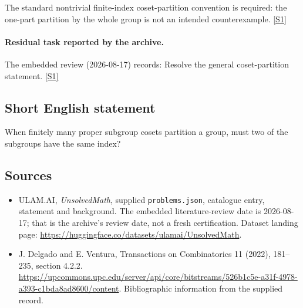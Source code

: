\documentclass[11pt,a4paper]{article}
\newcommand{\sref}[2]{\hyperlink{source:#1:#2}{[S#2]}}
\begin{document}
The standard nontrivial finite-index coset-partition convention is required: the one-part partition by the whole group is not an intended counterexample. \sref{statement}{1}

\paragraph{Residual task reported by the archive.}

The embedded review (2026-08-17) records: Resolve the general coset-partition statement. \sref{statement}{1}

\subsection{Short English statement}

When finitely many proper subgroup cosets partition a group, must two of the subgroups have the same index?

\subsection{Sources}

{\small

\begin{itemize}

\item[\hypertarget{source:statement:1}{S1}] ULAM.AI, \emph{UnsolvedMath}, supplied \texttt{problems.json}, catalogue entry, statement and background. The embedded literature-review date is 2026-08-17; that is the archive’s review date, not a fresh certification. Dataset landing page: \url{https://huggingface.co/datasets/ulamai/UnsolvedMath}.

\item[\hypertarget{source:statement:2}{S2}] J. Delgado and E. Ventura, Transactions on Combinatorics 11 (2022), 181--235, section 4.2.2. \url{https://upcommons.upc.edu/server/api/core/bitstreams/526b1c5e-a31f-4978-a393-c1bda8ad8600/content}. Bibliographic information from the supplied record.

\end{itemize}

}

\label{end:statement}
\end{document}
